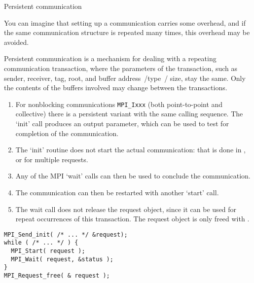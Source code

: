 
 {Persistent communication}
\label{sec:persistent}

You can imagine that setting up a communication
carries some overhead, and if the same communication structure
is repeated many times, this overhead may be avoided.

Persistent communication is a mechanism for dealing
with a repeating communication transaction,
where the parameters of the transaction,
such as sender, receiver, tag, root, and buffer address~/type~/ size,
stay the same.
Only the contents of the buffers involved may change between the transactions.

\begin{enumerate}
\item
  For nonblocking communications \lstinline{MPI_Ixxx}
  (both point-to-point and collective)
  there is a persistent variant 
  with the same calling sequence.
  The `init' call produces
  an  output parameter,
  which can be used to test for completion of the communication.
\item 
  The `init' routine does not start the actual communication:
  that is done in
  ,
  or  for multiple requests.
\item Any of the MPI `wait' calls can then be used
  to conclude the communication.
\item The communication can then be restarted with another `start' call.
\item The wait call does not release the request object,
  since it can be used for repeat occurrences of this transaction.
  The request object is only freed with .
\end{enumerate}

\begin{lstlisting}
MPI_Send_init( /* ... */ &request);
while ( /* ... */ ) {
  MPI_Start( request );
  MPI_Wait( request, &status );
}
MPI_Request_free( & request );
\end{lstlisting}

